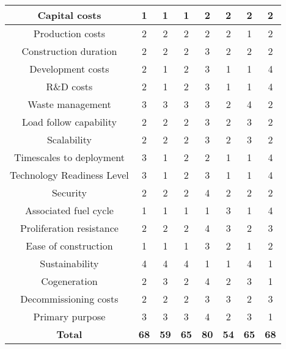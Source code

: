 \documentclass[journal]{IEEEtran}
\begin{document}
\begin{table}[!tb]
\begin{adjustbox}{width=0.47\textwidth,keepaspectratio}
\begin{tabular}{|c|c|c|c|c|c|c|c|}
Capital costs				& 1 & 1 & 1 & 2 & 2 & 2 & 2\\ \hline
Production costs			& 2 & 2 & 2 & 2 & 2 & 1 & 2\\ \hline
Construction duration		& 2 & 2 & 2 & 3 & 2 & 2 & 2\\ \hline
Development costs			& 2 & 1 & 2 & 3 & 1 & 1 & 4\\ \hline
R\&D costs				& 2 & 1 & 2 & 3 & 1 & 1 & 4\\ \hline
Waste management		& 3 & 3 & 3 & 3 & 2 & 4 & 2\\ \hline
Load follow capability		& 2 & 2 & 2 & 3 & 2 & 3 & 2\\ \hline
Scalability				& 2 & 2 & 2 & 3 & 2 & 3 & 2\\ \hline
Timescales to deployment		& 3 & 1 & 2 & 2 & 1 & 1 & 4\\ \hline
Technology Readiness Level	& 3 & 1 & 2 & 3 & 1 & 1 & 4\\ \hline
Security				& 2 & 2 & 2 & 4 & 2 & 2 & 2\\ \hline
Associated fuel cycle		& 1 & 1 & 1 & 1 & 3 & 1 & 4\\ \hline
Proliferation resistance		& 2 & 2 & 2 & 4 & 3 & 2 & 3\\ \hline
Ease of construction		& 1 & 1 & 1 & 3 & 2 & 1 & 2\\ \hline
Sustainability				& 4 & 4 & 4 & 1 & 1 & 4 & 1\\ \hline
Cogeneration			&2&3& 2 & 4 & 2 & 3 &  1\\ \hline
Decommissioning costs		& 2 & 2 & 2 & 3 & 3 & 2 & 3\\ \hline
Primary purpose			& 3 & 3 & 3 & 4 & 2 & 3 & 1\\ \hline
\textbf{Total}			&\textbf{68}&\textbf{59}&\textbf{65}&\textbf{80}&\textbf{54}&\textbf{65}&\textbf{68}  \\ \hline
\end{tabular}
\end{adjustbox}
\end{table}
\end{document}
